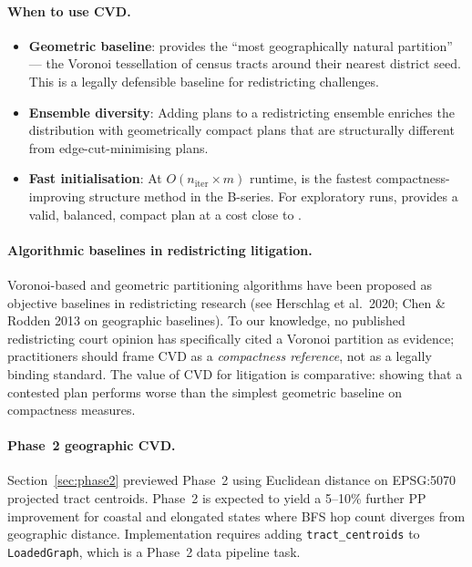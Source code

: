 \paragraph{When to use CVD.}
\begin{itemize}
\item \textbf{Geometric baseline}: \cvd{} provides the ``most geographically
  natural partition'' --- the Voronoi tessellation of census tracts around
  their nearest district seed.
  This is a legally defensible baseline for redistricting challenges.
\item \textbf{Ensemble diversity}: Adding \cvd{} plans to a redistricting
  ensemble enriches the distribution with geometrically compact plans that
  are structurally different from edge-cut-minimising plans.
\item \textbf{Fast initialisation}: At $O(n_{\mathrm{iter}} \times m)$ runtime,
  \cvd{} is the fastest compactness-improving structure method in the B-series.
  For exploratory runs, \cvd{} provides a valid, balanced, compact plan
  at a cost close to \metis{}.
\end{itemize}

\paragraph{Algorithmic baselines in redistricting litigation.}
Voronoi-based and geometric partitioning algorithms have been proposed as
objective baselines in redistricting research (see Herschlag et al.\ 2020;
Chen \& Rodden 2013 on geographic baselines).
To our knowledge, no published redistricting court opinion has specifically
cited a Voronoi partition as evidence; practitioners should frame CVD as a
\emph{compactness reference}, not as a legally binding standard.
The value of CVD for litigation is comparative: showing that a contested plan
performs worse than the simplest geometric baseline on compactness measures.

\paragraph{Phase~2 geographic CVD.}
Section~\ref{sec:phase2} previewed Phase~2 \cvd{} using Euclidean distance
on EPSG:5070 projected tract centroids.
Phase~2 is expected to yield a 5--10\% further PP improvement for coastal
and elongated states where BFS hop count diverges from geographic distance.
Implementation requires adding \texttt{tract\_centroids} to
\texttt{LoadedGraph}, which is a Phase~2 data pipeline task.

